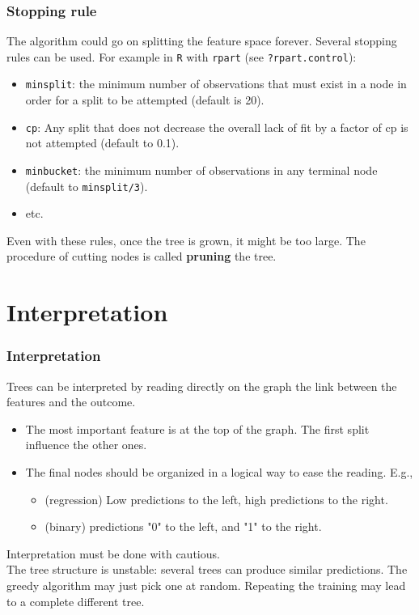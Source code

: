 \begin{frame}
\frametitle{Stopping rule}
The algorithm could go on splitting the feature space forever. Several stopping rules can be used. For example in {\tt R} with {\tt rpart} (see {\tt ?rpart.control}):
\begin{itemize}
\item {\tt minsplit}: the minimum number of observations that must exist in a node in order for a split to be attempted (default is 20).
\item {\tt cp}: Any split that does not decrease the overall lack of fit by a factor of cp is not attempted (default to 0.1).
\item {\tt minbucket}: the minimum number of observations in any terminal node (default to {\tt minsplit/3}).  
\item etc.
\end{itemize}
Even with these rules, once the tree is grown, it might be too large. The procedure of cutting nodes is called {\bf pruning} the tree.  
\end{frame}
\section{Interpretation}
\begin{frame}
\frametitle{Interpretation}
Trees can be interpreted by reading directly on the graph the link between the features and the outcome.
\begin{itemize}
\item The most important feature is at the top of the graph. The first split influence the other ones.
\item The final nodes should be organized in a logical way to ease the reading. E.g., 
\begin{itemize}
\item (regression) Low predictions to the left, high predictions to the right.
\item (binary) predictions "0" to the left, and "1" to the right.
\end{itemize}
\end{itemize}
Interpretation must be done with cautious. \\
\vspace{0.2cm}
The tree structure is unstable: several trees can produce similar predictions. The greedy algorithm may just pick one at random. Repeating the training may lead to a complete different tree.
\end{frame}
